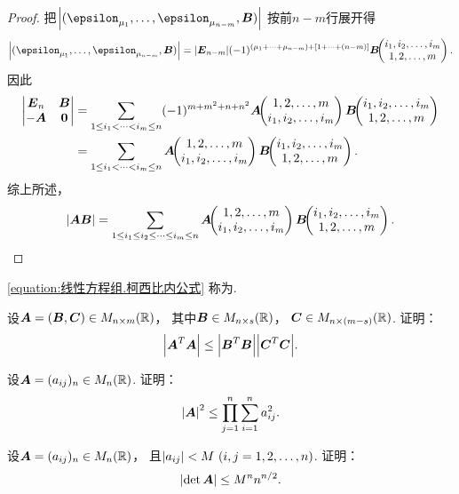 \begin{theorem}
\begin{proof}
把\(\abs{(\vb\epsilon_{\mu_1},\dotsc,\vb\epsilon_{\mu_{n-m}},\vb{B})}\)
按前\(n-m\)行展开得\begin{equation*}
	\abs{(\vb\epsilon_{\mu_1},\dotsc,\vb\epsilon_{\mu_{n-m}},\vb{B})}
	= \abs{\vb{E}_{n-m}}
	(-1)^{(\mu_1+\dotsb+\mu_{n-m})+[1+\dotsb+(n-m)]}
	\MatrixMinor{\vb{B}}{
		i_1,i_2,\dotsc,i_m \\
		1,2,\dotsc,m
	}.
\end{equation*}
因此\begin{align*}
	\begin{vmatrix}
		\boldsymbol{E}_n & \boldsymbol{B} \\
		-\boldsymbol{A} & \boldsymbol0
	\end{vmatrix}
	&= \sum_{1 \leq i_1 < \dotsb < i_m \leq n}
	(-1)^{m+m^2+n+n^2}
	\boldsymbol{A}\kern-3.8pt\begin{pmatrix}
		1,2,\dotsc,m \\
		i_1,i_2,\dotsc,i_m
	\end{pmatrix}
	\boldsymbol{B}\kern-3.8pt\begin{pmatrix}
		i_1,i_2,\dotsc,i_m \\
		1,2,\dotsc,m
	\end{pmatrix} \\
	&= \sum_{1 \leq i_1 < \dotsb < i_m \leq n}
	\boldsymbol{A}\kern-3.8pt\begin{pmatrix}
		1,2,\dotsc,m \\
		i_1,i_2,\dotsc,i_m
	\end{pmatrix}
	\boldsymbol{B}\kern-3.8pt\begin{pmatrix}
		i_1,i_2,\dotsc,i_m \\
		1,2,\dotsc,m
	\end{pmatrix}.
\end{align*}
综上所述，\begin{equation*}
	\abs{\boldsymbol{A}\boldsymbol{B}}
	= \sum_{1 \leq i_1 \leq i_2 \leq \dotsb \leq i_m \leq n}
	\boldsymbol{A}\kern-3.8pt\begin{pmatrix}
		1,2,\dotsc,m \\
		i_1,i_2,\dotsc,i_m
	\end{pmatrix}
	\boldsymbol{B}\kern-3.8pt\begin{pmatrix}
		i_1,i_2,\dotsc,i_m \\
		1,2,\dotsc,m
	\end{pmatrix}.
	\qedhere
\end{equation*}
\end{proof}
\end{theorem}
\cref{equation:线性方程组.柯西比内公式} 称为.


\begin{example}
设\(\boldsymbol{A} = (\boldsymbol{B},\boldsymbol{C}) \in M_{n \times m}(\mathbb{R})\)，
其中\(\boldsymbol{B} \in M_{n \times s}(\mathbb{R})\)，
\(\boldsymbol{C} \in M_{n \times (m-s)}(\mathbb{R})\).
证明：\begin{equation}
\abs{\boldsymbol{A}^T \boldsymbol{A}} \leq \abs{\boldsymbol{B}^T \boldsymbol{B}} \abs{\boldsymbol{C}^T \boldsymbol{C}}.
\end{equation}
\end{example}

\begin{example}
设\(\boldsymbol{A} = (a_{ij})_n \in M_n(\mathbb{R})\).
证明：\begin{equation}\label{equation:线性方程组.Hadamard不等式}
	\abs{\boldsymbol{A}}^2 \leq \prod_{j=1}^n \sum_{i=1}^n a_{ij}^2.
\end{equation}
\end{example}

\begin{example}
设\(\boldsymbol{A} = (a_{ij})_n \in M_n(\mathbb{R})\)，
且\(\abs{a_{ij}} < M\ (i,j=1,2,\dotsc,n)\).
证明：\begin{equation}
	\abs{\det\boldsymbol{A}} \leq M^n n^{n/2}.
\end{equation}
\end{example}
